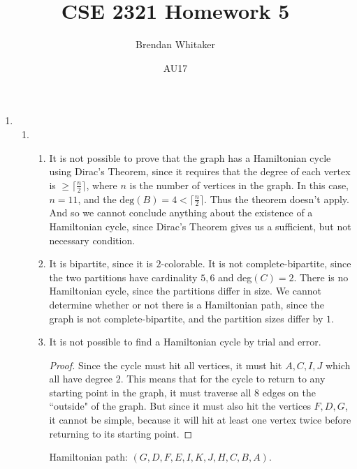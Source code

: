 \documentclass[10pt,oneside,reqno]{amsart}
\theoremstyle{plain}
\theoremstyle{definition}
\begin{document}
\title{CSE 2321 Homework 5}

\date{AU17}

\author[Brendan Whitaker]{Brendan Whitaker}

\maketitle

\begin{enumerate}[label=\arabic*.]

\item 

\begin{enumerate}

\item 

\begin{enumerate}

\item It is not possible to prove that the graph has a Hamiltonian cycle using Dirac's Theorem, since it requires that the degree of each vertex is $\geq \lceil \frac{n}{2} \rceil $, where $n$ is the number of vertices in the graph. In this case, $n = 11$, and the $\text{deg}(B) = 4 < \lceil \frac{n}{2} \rceil$. Thus the theorem doesn't apply. And so we cannot conclude anything about the existence of a Hamiltonian cycle, since Dirac's Theorem gives us a sufficient, but not necessary condition. \\

\item It is bipartite, since it is $2$-colorable. It is not complete-bipartite, since the two partitions have cardinality $5,6$ and deg$(C) = 2$. There is no Hamiltonian cycle, since the partitions differ in size. We cannot determine whether or not there is a Hamiltonian path, since the graph is not complete-bipartite, and the partition sizes differ by $1$.  \\

\vspace{100mm}

\item It is not possible to find a Hamiltonian cycle by trial and error. 
\begin{proof}
Since the cycle must hit all vertices, it must hit $A,C,I,J$ which all have degree $2$. This means that for the cycle to return to any starting point in the graph, it must traverse all $8$ edges on the ``outside" of the graph. But since it must also hit the vertices $F,D,G$, it cannot be simple, because it will hit at least one vertex twice before returning to its starting point. 
\end{proof}
Hamiltonian path: $(G,D,F,E,I,K,J,H,C,B,A)$. \\


\end{enumerate}
\end{enumerate}
\end{enumerate}
\end{document}
